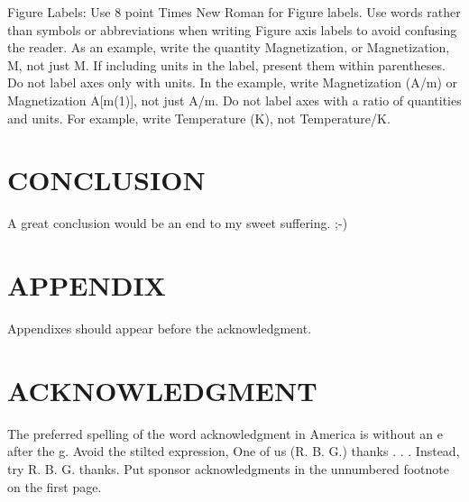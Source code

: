 \documentclass[letterpaper, 10 pt, conference]{ieeeconf}  %
\begin{document}
Figure Labels: Use 8 point Times New Roman for Figure labels. Use words rather than symbols or abbreviations when writing Figure axis labels to avoid confusing the reader. As an example, write the quantity Magnetization, or Magnetization, M, not just M. If including units in the label, present them within parentheses. Do not label axes only with units. In the example, write Magnetization (A/m) or Magnetization {A[m(1)]}, not just A/m. Do not label axes with a ratio of quantities and units. For example, write Temperature (K), not Temperature/K.

\section{CONCLUSION}
A great conclusion would be an end to my sweet suffering. ;-)

\addtolength{\textheight}{-12cm}   %







\section*{APPENDIX}

Appendixes should appear before the acknowledgment.

\section*{ACKNOWLEDGMENT}

The preferred spelling of the word acknowledgment in America is without an e after the g. Avoid the stilted expression, One of us (R. B. G.) thanks . . .  Instead, try R. B. G. thanks. Put sponsor acknowledgments in the unnumbered footnote on the first page.
\end{document}
